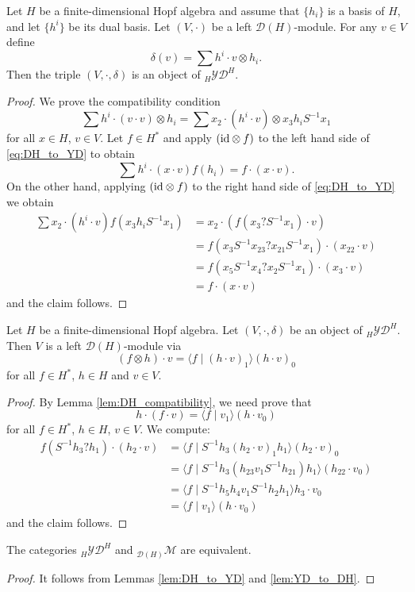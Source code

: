 \begin{lemma}
\label{lem:DH_to_YD}
Let $H$ be a finite-dimensional Hopf algebra and assume that $\{h_i\}$ is a basis
of $H$, and let $\{h^i\}$ be its dual basis.  
Let $(V,\cdot)$ be a left $\mathcal{D}(H)$-module. For any $v\in V$ define 
\[
\delta(v)=\sum h^i\cdot v\otimes h_i.
\]
Then the triple $(V,\cdot,\delta)$ is an object of $_H\mathcal{YD}^H$.
\end{lemma}

\begin{proof}
We prove the compatibility condition
\begin{equation}
\label{eq:DH_to_YD}
\sum h^i\cdot (v\cdot v)\otimes h_i=\sum x_2\cdot(h^i\cdot v)\otimes x_3h_iS^{-1}x_1
\end{equation}
for all $x\in H$, $v\in V$. Let $f\in H^*$ and apply $(\mathrm{id}\otimes f)$ to the
left hand side of \eqref{eq:DH_to_YD} to obtain
\[
\sum h^i\cdot (x\cdot v)f(h_i)=f\cdot (x\cdot v).
\]
On the other hand, applying $(\mathrm{id}\otimes f)$ to the right hand side of
\eqref{eq:DH_to_YD} we obtain
\begin{align*}
\sum x_2\cdot(h^i\cdot v) f(x_3h_iS^{-1}x_1)&=
x_2\cdot\left( f(x_3?S^{-1}x_1)\cdot v\right)\\
&=f(x_3S^{-1}x_{23}?x_{21}S^{-1}x_1)\cdot (x_{22}\cdot v)\\
&=f(x_5S^{-1}x_4?x_2S^{-1}x_1)\cdot(x_3\cdot v)\\
&=f\cdot (x\cdot v)
\end{align*}
and the claim follows.
\end{proof}

\begin{lemma}
\label{lem:YD_to_DH}
Let $H$ be a finite-dimensional Hopf algebra. Let 
$(V,\cdot,\delta)$ be an object of $_H\mathcal{YD}^H$. Then $V$ is a left
$\mathcal{D}(H)$-module via 
\[
(f\otimes h)\cdot v=\langle f\mid (h\cdot v)_1\rangle (h\cdot v)_0
\]
for all $f\in H^*$, $h\in H$ and $v\in V$.
\end{lemma}

\begin{proof}
By Lemma \ref{lem:DH_compatibility}, we need prove that
\[
h \cdot(f\cdot v)=\langle f\mid v_1\rangle(h\cdot v_0)
\]
for all $f\in H^*$, $h\in H$, $v\in V$. We compute:
\begin{align*}
f(S^{-1}h_3?h_1)\cdot(h_2\cdot v)&=\langle f\mid S^{-1}h_3(h_2\cdot v)_1h_1\rangle(h_2\cdot v)_0\\
&=\langle f\mid S^{-1}h_3(h_{23}v_1S^{-1}h_{21})h_1\rangle(h_{22}\cdot v_0)\\
&=\langle f\mid S^{-1}h_5h_4v_1S^{-1}h_2h_1\rangle h_3\cdot v_0\\
&=\langle f\mid v_1\rangle (h\cdot v_0)
\end{align*}
and the claim follows.
\end{proof}

\begin{theorem}
The categories $_H\mathcal{YD}^H$ and $_{\mathcal{D}(H)}\mathcal{M}$ are
equivalent.
\end{theorem}

\begin{proof}
It follows from Lemmas \ref{lem:DH_to_YD} and \ref{lem:YD_to_DH}.
\end{proof}

